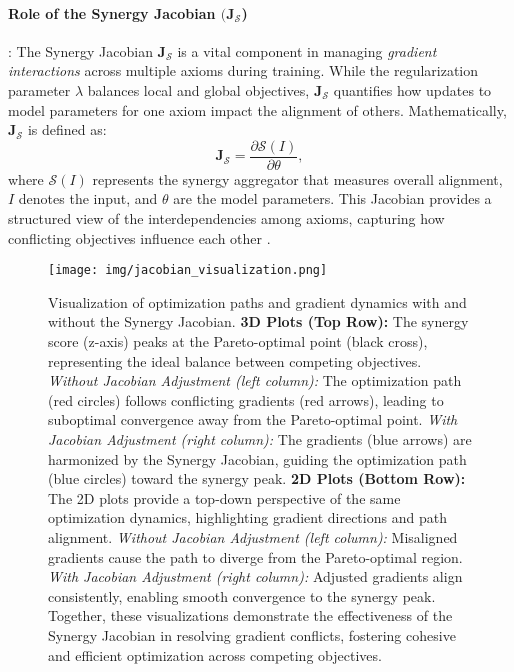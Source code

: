 \paragraph{Role of the Synergy Jacobian $(\mathbf{J}_{\mathcal{S}}$)}: The Synergy Jacobian \(\mathbf{J}_{\mathcal{S}}\) is a vital component in managing \emph{gradient interactions} across multiple axioms during training. While the regularization parameter \(\lambda\) balances local and global objectives, \(\mathbf{J}_{\mathcal{S}}\) quantifies how updates to model parameters for one axiom impact the alignment of others. Mathematically, \(\mathbf{J}_{\mathcal{S}}\) is defined as:
\[
\mathbf{J}_{\mathcal{S}} = \frac{\partial \mathcal{S}(I)}{\partial \theta},
\]
where \(\mathcal{S}(I)\) represents the synergy aggregator that measures overall alignment, \(I\) denotes the input, and \(\theta\) are the model parameters. This Jacobian provides a structured view of the interdependencies among axioms, capturing how conflicting objectives influence each other \cite{navon2022multi, yu2020gradient}.


\begin{figure*}[ht!]
    \texttt{[image: img/jacobian\_visualization.png]}
    \caption{
        Visualization of optimization paths and gradient dynamics with and without the Synergy Jacobian.
        \textbf{3D Plots (Top Row):} The synergy score (z-axis) peaks at the Pareto-optimal point (black cross), representing the ideal balance between competing objectives. 
        \textit{Without Jacobian Adjustment (left column):} The optimization path (red circles) follows conflicting gradients (red arrows), leading to suboptimal convergence away from the Pareto-optimal point.
        \textit{With Jacobian Adjustment (right column):} The gradients (blue arrows) are harmonized by the Synergy Jacobian, guiding the optimization path (blue circles) toward the synergy peak.
        \textbf{2D Plots (Bottom Row):} The 2D plots provide a top-down perspective of the same optimization dynamics, highlighting gradient directions and path alignment. 
        \textit{Without Jacobian Adjustment (left column):} Misaligned gradients cause the path to diverge from the Pareto-optimal region.
        \textit{With Jacobian Adjustment (right column):} Adjusted gradients align consistently, enabling smooth convergence to the synergy peak. Together, these visualizations demonstrate the effectiveness of the Synergy Jacobian in resolving gradient conflicts, fostering cohesive and efficient optimization across competing objectives.
    }
    \label{fig:jacobian_visualization}
\end{figure*}




